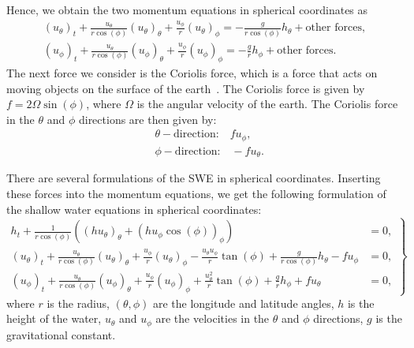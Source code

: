 Hence, we obtain the two momentum equations in spherical coordinates as
\begin{equation}
    \begin{aligned}
         {(u_\theta)}_t + \frac{u_\theta}{r \cos(\phi)} {(u_\theta)}_\theta + \frac{u_\phi}{r} {(u_\theta)}_\phi = -\frac{g}{r \cos(\phi)} h_{\theta} + \text{other forces}, \\
        {( u_\phi)}_t + \frac{u_\theta}{r \cos(\phi)} {(u_\phi)}_\theta   + \frac{u_\phi}{r} {(u_\phi)}_\phi = -\frac{g}{r} h_{\phi} + \text{other forces}.
    \end{aligned}
\end{equation}
The next force we consider is the Coriolis force, which is a force that acts on moving objects on the surface of the earth~\cite{Coriolis}.
The Coriolis force is given by $f = 2 \Omega \sin(\phi)$, where $\Omega$ is the angular velocity of the earth.
The Coriolis force in the $\theta$ and $\phi$ directions are then given by:
\begin{align*}
   &\theta-\text{direction:} \quad f u_\phi,\\
    &\phi-\text{direction:} \quad -f u_\theta.
\end{align*}


There are several formulations of the SWE in spherical coordinates.
Inserting these forces into the momentum equations, we get the following formulation of the shallow water equations in spherical coordinates:
\begin{equation}
    \left.
    \begin{aligned}
        h_t + \frac{1}{r \cos (\phi)} \left( {(h u_\theta)}_{\theta} + {(h u_{\phi} \cos(\phi))}_{\phi}  \right) &= 0, \\
        {(u_{\theta})}_t  + \frac{u_\theta}{r \cos (\phi)} {(u_\theta)}_\theta + \frac{u_\phi}{r} {(u_\theta)}_{\phi}
        - \frac{u_\theta u_\phi }{r} \tan(\phi) + \frac{g}{r \cos (\phi)} h_\theta - f u_\phi &= 0, \\
        {(u_{\phi})}_t  + \frac{u_\theta}{r \cos (\phi)} {(u_\phi)}_\theta + \frac{u_\phi}{r} {(u_\phi)}_{\phi}
        + \frac{u_\theta^2}{r} \tan(\phi) + \frac{g}{r} h_\phi + f u_\theta &= 0,
    \end{aligned}
    \right\}
\end{equation}
where $r$ is the radius, $(\theta, \phi)$ are the longitude and latitude angles, $h$ is the height of the water, $u_\theta$ and $u_\phi$ are the velocities in the $\theta$ and $\phi$ directions, $g$ is the gravitational constant.

